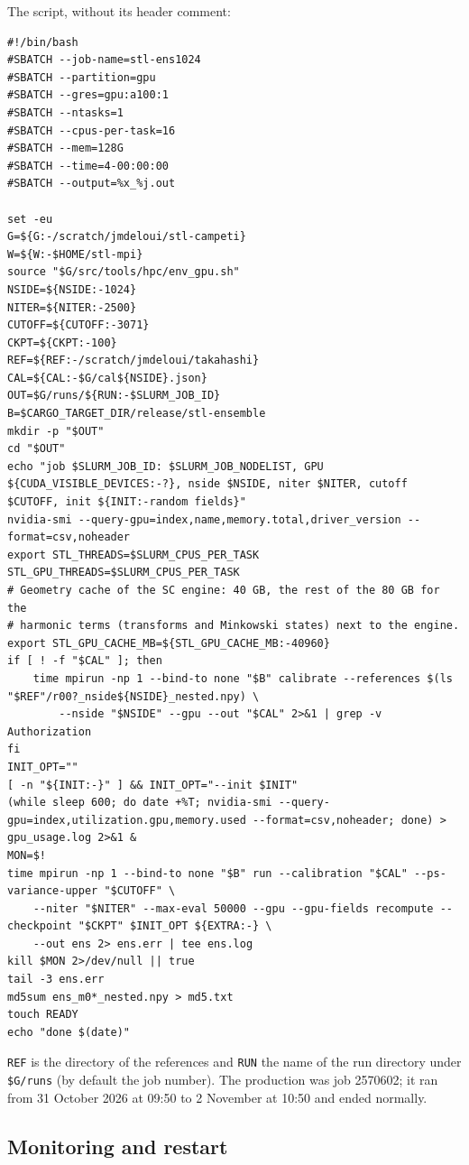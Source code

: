 \documentclass{aa}
\begin{document}
The script, without its header comment:
\begin{lstlisting}
#!/bin/bash
#SBATCH --job-name=stl-ens1024
#SBATCH --partition=gpu
#SBATCH --gres=gpu:a100:1
#SBATCH --ntasks=1
#SBATCH --cpus-per-task=16
#SBATCH --mem=128G
#SBATCH --time=4-00:00:00
#SBATCH --output=%x_%j.out

set -eu
G=${G:-/scratch/jmdeloui/stl-campeti}
W=${W:-$HOME/stl-mpi}
source "$G/src/tools/hpc/env_gpu.sh"
NSIDE=${NSIDE:-1024}
NITER=${NITER:-2500}
CUTOFF=${CUTOFF:-3071}
CKPT=${CKPT:-100}
REF=${REF:-/scratch/jmdeloui/takahashi}
CAL=${CAL:-$G/cal${NSIDE}.json}
OUT=$G/runs/${RUN:-$SLURM_JOB_ID}
B=$CARGO_TARGET_DIR/release/stl-ensemble
mkdir -p "$OUT"
cd "$OUT"
echo "job $SLURM_JOB_ID: $SLURM_JOB_NODELIST, GPU ${CUDA_VISIBLE_DEVICES:-?}, nside $NSIDE, niter $NITER, cutoff $CUTOFF, init ${INIT:-random fields}"
nvidia-smi --query-gpu=index,name,memory.total,driver_version --format=csv,noheader
export STL_THREADS=$SLURM_CPUS_PER_TASK STL_GPU_THREADS=$SLURM_CPUS_PER_TASK
# Geometry cache of the SC engine: 40 GB, the rest of the 80 GB for the
# harmonic terms (transforms and Minkowski states) next to the engine.
export STL_GPU_CACHE_MB=${STL_GPU_CACHE_MB:-40960}
if [ ! -f "$CAL" ]; then
    time mpirun -np 1 --bind-to none "$B" calibrate --references $(ls "$REF"/r00?_nside${NSIDE}_nested.npy) \
        --nside "$NSIDE" --gpu --out "$CAL" 2>&1 | grep -v Authorization
fi
INIT_OPT=""
[ -n "${INIT:-}" ] && INIT_OPT="--init $INIT"
(while sleep 600; do date +%T; nvidia-smi --query-gpu=index,utilization.gpu,memory.used --format=csv,noheader; done) > gpu_usage.log 2>&1 &
MON=$!
time mpirun -np 1 --bind-to none "$B" run --calibration "$CAL" --ps-variance-upper "$CUTOFF" \
    --niter "$NITER" --max-eval 50000 --gpu --gpu-fields recompute --checkpoint "$CKPT" $INIT_OPT ${EXTRA:-} \
    --out ens 2> ens.err | tee ens.log
kill $MON 2>/dev/null || true
tail -3 ens.err
md5sum ens_m0*_nested.npy > md5.txt
touch READY
echo "done $(date)"
\end{lstlisting}
\texttt{REF} is the directory of the references and \texttt{RUN} the name of the run directory under \texttt{\$G/runs} (by default the job number). The production was job 2570602; it ran from 31 October 2026 at 09:50 to 2 November at 10:50 and ended normally.

\subsection{Monitoring and restart}
\end{document}
